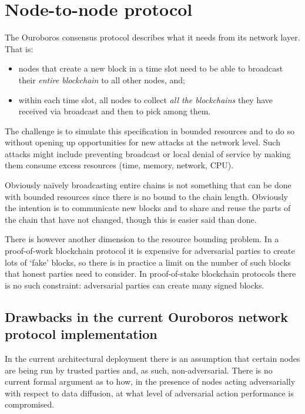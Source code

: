 \documentclass{article}
\theoremstyle{definition}{
  \newtheorem{lemma}{Lemma}[section] %
  \newtheorem{definition}[lemma]{Definition}
}
\theoremstyle{theorem}{
  \newtheorem{invariant}[lemma]{Invariant}
  \newtheorem{proofobligation}[lemma]{Proof Obligation}
}
\numberwithin{equation}{lemma}
\begin{document}
\section{Node-to-node protocol}

The Ouroboros consensus protocol \citep{ouroboros-classic} describes what it
needs from its network layer. That is:
\begin{itemize}
\item nodes that create a new block in a time slot need to be able to broadcast
      their \emph{entire blockchain} to all other nodes, and;
\item within each time slot, all nodes to collect \emph{all the blockchains}
      they have received via broadcast and then to pick among them.
\end{itemize}

The challenge is to simulate this specification in bounded resources and to do
so without opening up opportunities for new attacks at the network level. Such
attacks might include preventing broadcast or local denial of service by making
them consume excess resources (time, memory, network, CPU).

Obviously na\"ively broadcasting entire chains is not something that can be
done with bounded resources since there is no bound to the chain length.
Obviously the intention is to communicate new blocks and to share and reuse the
parts of the chain that have not changed, though this is easier said than done.

There is however another dimension to the resource bounding problem. In a
proof-of-work blockchain protocol it is expensive for adversarial parties to
create lots of `fake' blocks, so there is in practice a limit on the number of
such blocks that honest parties need to consider. In proof-of-stake blockchain
protocols there is no such constraint: adversarial parties can create many
signed blocks.

\subsection{Drawbacks in the current Ouroboros network protocol implementation}

In the current architectural deployment there is an assumption that certain
nodes are being run by trusted parties and, as such, non-adversarial. There is
no current formal argument as to how, in the presence of nodes acting
adversarially with respect to data diffusion, at what level of adversarial
action performance is compromised.
\end{document}
